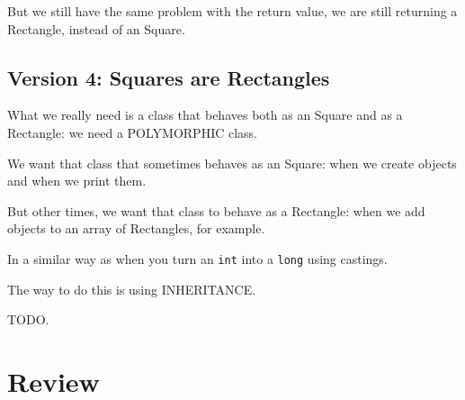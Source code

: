 \documentclass[a4paper, 9pt]{extarticle}
\begin{document}
But we still have the same problem with the return value, we are still
returning a Rectangle, instead of an Square.


\subsection{Version 4: Squares are Rectangles}

What we really need is a class that behaves both as an Square and as a
Rectangle: we need a POLYMORPHIC class.

We want that class that sometimes behaves as an Square: when we create objects
and when we print them.

But other times, we want that class to behave as a Rectangle: when we add
objects to an array of Rectangles, for example.

In a similar way as when you turn an \verb+int+ into a \verb+long+ using
castings.

The way to do this is using INHERITANCE.

\begin{multicols}{2}
\columnbreak
\end{multicols}


TODO.

\section{Review}

\begin{blackboard}

\end{blackboard}
\end{document}
